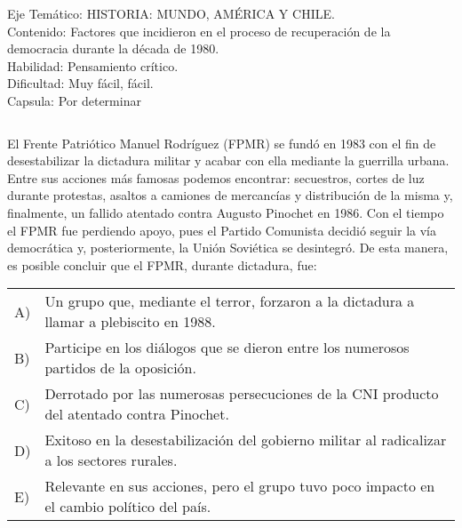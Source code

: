 \documentclass[letterpaper,11pt]{article}
\newcommand{\anchopregunta}{0.9\textwidth}
\begin{document}
\begin{enumerate}
\begin{minipage}{\anchopregunta}
\begin{info} %
\begin{flushleft}
Eje Temático: HISTORIA: MUNDO, AMÉRICA Y CHILE.\\
Contenido: Factores que incidieron en el proceso de recuperación de la democracia durante la década de 1980.\\
Habilidad: Pensamiento crítico.\\
Dificultad: Muy fácil, fácil.\\
Capsula: Por determinar \\
\end{flushleft} 
\end{info}
\end{minipage}\vfill$\;$ %

\begin{minipage}{\anchopregunta}
\item El Frente Patriótico Manuel Rodríguez (FPMR) se fundó en 1983 con el fin de desestabilizar la dictadura militar y acabar con ella mediante la guerrilla urbana. Entre sus acciones más famosas podemos encontrar: secuestros, cortes de luz durante protestas, asaltos a camiones de mercancías y distribución de la misma y, finalmente, un fallido atentado contra Augusto Pinochet en 1986. Con el tiempo el FPMR fue perdiendo apoyo, pues el Partido Comunista decidió seguir la vía democrática y, posteriormente, la Unión Soviética se desintegró. De esta manera, es posible concluir que el FPMR, durante dictadura, fue:
\begin{flushleft}\begin{tabular}{@{\hspace{-.001\textwidth}}l@{\hspace{2pt}}p{}}
A)& Un grupo que, mediante el terror, forzaron a la dictadura a llamar a plebiscito en 1988.\\
B)& Participe en los diálogos que se dieron entre los numerosos partidos de la oposición.\\
C)& Derrotado por las numerosas persecuciones de la CNI producto del atentado contra Pinochet.\\
D)& Exitoso en la desestabilización del gobierno militar al radicalizar a los sectores rurales.\\
E)& Relevante en sus acciones, pero el grupo tuvo poco impacto en el cambio político del país.\\ 
\end{tabular}\end{flushleft}%

\end{minipage}
\end{enumerate}
\end{document}
